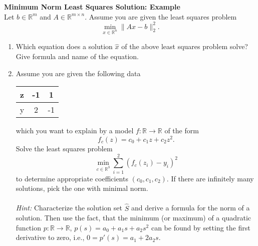\textbf{Minimum Norm Least Squares Solution: Example}\\
Let $b \in \mathbb{R}^m$ and $A \in \mathbb{R}^{m \times n}$.
Assume you are given the least squares problem 
$$
\min\limits_{x \in \mathbb{R}^n} \| Ax-b \|_2^2.
$$
\begin{enumerate}
	\item Which equation does a solution $\hat{x}$ of the above least squares problem solve? Give formula and name of the equation.
	\item Assume you are given the following data
	\begin{center}
		\begin{tabular}{l|cc}
			z&-1&1\\
			\hline
			y&2&-1
		\end{tabular}
	\end{center}
 which you want to explain by a model $f:\mathbb{R} \to \mathbb{R}$ of the form 
	$$f_c(z) = c_0 + c_1z + c_2z^2.$$
	Solve the least squares problem
	$$
	\min\limits_{c \in \mathbb{R}^3} \sum_{i=1}^2 (f_c(z_i) - y_i)^2
	$$
	to determine appropriate coefficients $(c_0, c_1, c_2)$. If there are infinitely many solutions, pick the one with minimal norm.\\~\\
	\textit{Hint:} Characterize the solution set $\hat{S}$ and derive a formula for the norm of a solution. Then use the fact, that the minimum (or maximum) of a quadratic function $p\colon\mathbb{R} \to \mathbb{R}$, $p(s)= a_0+a_1s+a_2s^2$ can be found by setting the first derivative to zero, i.e., $0=p'(s)=a_1+2a_2 s$.
\end{enumerate} 